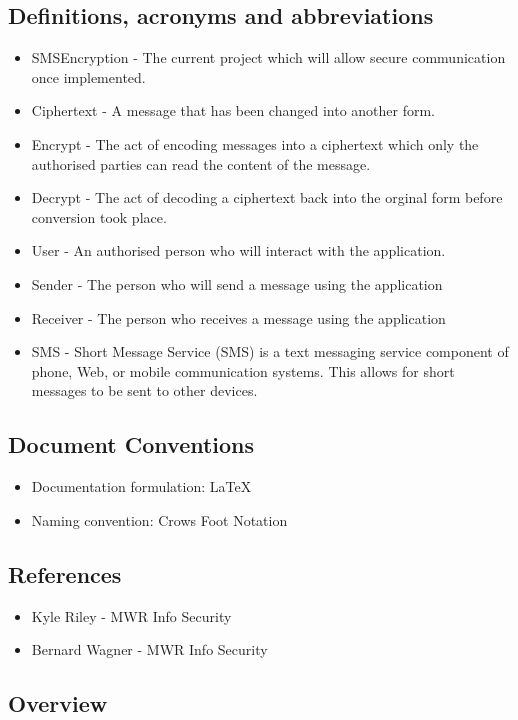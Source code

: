 \subsection{Definitions, acronyms and abbreviations}
\begin{itemize}
\item SMSEncryption - The current project which will allow secure communication once implemented.
\item Ciphertext - A message that has been changed into another form.
\item Encrypt - The act of encoding messages into a ciphertext which only the authorised parties can read the content of the message.
\item Decrypt - The act of decoding a ciphertext back into the orginal form before conversion took place.
\item User - An authorised person who will interact with the application.
\item Sender - The person who will send a message using the application
\item Receiver - The person who receives a message using the application
\item SMS - Short Message Service (SMS) is a text messaging service component of phone, Web, or mobile communication systems. This allows for short messages to be sent to other devices.
\end{itemize}

\subsection{Document Conventions}
\begin{itemize}
\item Documentation formulation: LaTeX
\item Naming convention: Crows Foot Notation
\end{itemize}

\subsection{References}
\begin{itemize}
\item{Kyle Riley - MWR Info Security}
\item{Bernard Wagner - MWR Info Security}
\end{itemize}

\subsection{Overview}